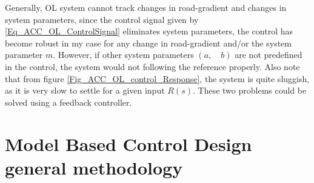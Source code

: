 Generally, OL system cannot track changes in road-gradient and changes in system parameters, since the control signal given by \eqref{Eq_ACC_OL_ControlSignal} eliminates system parameters, the control has become robust in my case for any change in road-gradient and/or the system parameter $m$. However, if other system parameters $(a, \quad b)$ are not predefined in the control, the system would not following the reference properly. Also note that from figure \ref{Fig_ACC_OL_control_Response}, the system is quite sluggish, as it is very slow to settle for a given input $R(s)$. These two problems could be solved using a feedback controller.

\section{Model Based Control Design general methodology}

